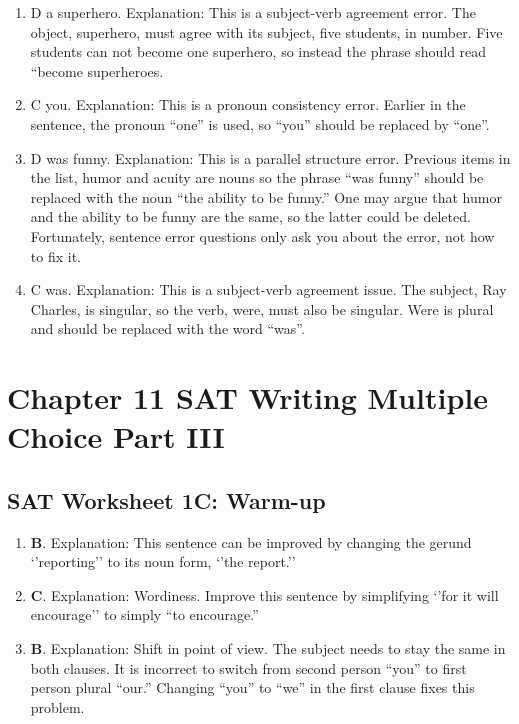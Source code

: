 \begin{enumerate}
\begin{itemize}
\begin{enumerate}
\item D a superhero. Explanation: This is a subject-verb agreement error. The object, superhero, must agree with its subject, five students, in number. Five students can not become one superhero, so instead the phrase should read ``become superheroes. 

\item C you.  Explanation: This is a pronoun consistency error. Earlier in the sentence, the pronoun ``one'' is used, so ``you'' should be replaced by ``one''. 

\item D was funny. Explanation: This is a parallel structure error. Previous items in the list, humor and acuity are nouns so the phrase ``was funny'' should be replaced with the noun ``the ability to be funny.'' One may argue that humor and the ability to be funny are the same, so the latter could be deleted. Fortunately, sentence error questions only ask you about the error, not how to fix it. 

\item C was. Explanation: This is a subject-verb agreement issue. The subject, Ray Charles, is singular, so the verb, were, must also be singular. Were is plural and should be replaced with the word ``was''. 
\end{enumerate}



\section{Chapter 11 SAT Writing Multiple Choice Part III}



\subsection{SAT Worksheet 1C: Warm-up}

\begin{enumerate}
\item \textbf{B}. Explanation:  This sentence can be improved by changing the gerund `'reporting'' to its noun form, `'the report.''
\item \textbf{C}. Explanation:  Wordiness.  Improve this sentence by simplifying `'for it will encourage'' to simply ``to encourage.''
\item \textbf{B}. Explanation:  Shift in point of view.  The subject needs to stay the same in both clauses.  It is incorrect to switch from second person ``you'' to first person plural ``our.''  Changing ``you'' to ``we'' in the first clause fixes this problem.
\end{enumerate}



\end{itemize}
\end{enumerate}
